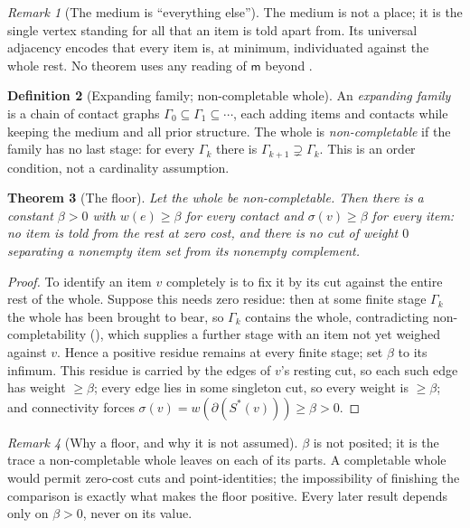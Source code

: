 \documentclass[twocolumn,11pt,a4paper]{article}
\theoremstyle{sup}
\newtheorem{theorem}{Theorem}[section]
\theoremstyle{definition}
\newtheorem{definition}[theorem]{Definition}
\theoremstyle{remark}
\newtheorem{remark}[theorem]{Remark}
\newcommand{\flo}{\beta}              %
\newcommand{\med}{\mathsf{m}}         %
\newcommand{\cut}{\partial}
\newcommand{\str}{\sigma}             %
\begin{document}
\begin{remark}[The medium is ``everything else'']
\label{rem:medium}
The medium is not a place; it is the single vertex standing for all that an item
is told apart from. Its universal adjacency encodes that every item is, at
minimum, individuated against the whole rest. No theorem uses any reading of
$\med$ beyond .
\end{remark}

\begin{definition}[Expanding family; non-completable whole]
\label{def:noncompletable}
An \emph{expanding family} is a chain of contact graphs
$\Gamma_0\subseteq\Gamma_1\subseteq\cdots$, each adding items and contacts while
keeping the medium and all prior structure. The whole is \emph{non-completable}
if the family has no last stage: for every $\Gamma_k$ there is
$\Gamma_{k+1}\supsetneq\Gamma_k$. This is an order condition, not a cardinality
assumption.
\end{definition}

\begin{theorem}[The floor]
\label{thm:floor}
Let the whole be non-completable. Then there is a constant $\flo>0$ with
$w(e)\ge\flo$ for every contact and $\str(v)\ge\flo$ for every item: no item is
told from the rest at zero cost, and there is no cut of weight $0$ separating a
nonempty item set from its nonempty complement.
\end{theorem}

\begin{proof}
To identify an item $v$ completely is to fix it by its cut against the entire
rest of the whole. Suppose this needs zero residue: then at some finite stage
$\Gamma_k$ the whole has been brought to bear, so $\Gamma_k$ contains the whole,
contradicting non-completability (), which supplies a
further stage with an item not yet weighed against $v$. Hence a positive residue
remains at every finite stage; set $\flo$ to its infimum. This residue is carried
by the edges of $v$'s resting cut, so each such edge has weight $\ge\flo$; every
edge lies in some singleton cut, so every weight is $\ge\flo$; and connectivity
forces $\str(v)=w(\cut(S^\ast(v)))\ge\flo>0$.
\end{proof}

\begin{remark}[Why a floor, and why it is not assumed]
\label{rem:trace}
$\flo$ is not posited; it is the trace a non-completable whole leaves on each of
its parts. A completable whole would permit zero-cost cuts and point-identities;
the impossibility of finishing the comparison is exactly what makes the floor
positive. Every later result depends only on $\flo>0$, never on its value.
\end{remark}
\end{document}
